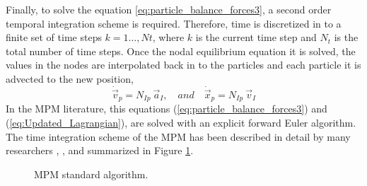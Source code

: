 Finally, to solve the equation \eqref{eq:particle_balance_forces3}, a second order
temporal integration scheme is required. Therefore, time is
discretized in to a finite set of time steps $k = 1\ldots ,Nt$, where $k$ is the current time step and $N_t$
is the total number of time steps. Once the nodal equilibrium equation it is solved, the values in the nodes are
interpolated back in to the particles and each particle it is advected
to the new position,
\begin{equation}
  \label{eq:Updated_Lagrangian}
  \dot{\vec{v}}_p = N_{Ip}\ \vec{a}_{I},\quad and\quad
  \dot{\vec{x}}_{p} = N_{Ip}\ \vec{v}_{I}  
\end{equation}
In the MPM literature, this equations
(\ref{eq:particle_balance_forces3}) and (\ref{eq:Updated_Lagrangian}),
are solved with an explicit forward Euler algorithm. The time integration scheme of the MPM has been described in detail by many researchers
\cite{Sulsky1994}, \cite{Bardenhagen2002}, \cite{thesis_Andersen_2009} and summarized
in Figure \ref{fig:MPM_algorithm}.

\begin{figure}\sidecaption
  \centering
  \caption{MPM standard algorithm.}
  \label{fig:MPM_algorithm}
\end{figure}

